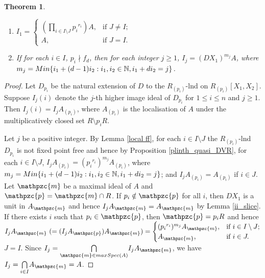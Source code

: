 \documentclass[a4paper,12pt]{article}
\newtheorem{thm}{Theorem}[section]
\newcommand{\p}{\mathpzc{p}}
\newcommand{\m}{\mathpzc{m}}
\newcommand{\bN}{\mathbb N}
\begin{document}
{\begin{thm}
\begin{enumerate}
	\item[\rm(I)] $I_1=
	\begin{cases}
		({\underset{i\in I\setminus J}\prod}{p_i}^{r_i})A, & \text{if } J\neq I;\\
		A, & \text{if } J=I.
	\end{cases}
	$
	\item[\rm(II)]  If for each $i\in I$, $p_i\nmid f_d$, then for each integer $j\geqslant 1$, $I_j=(DX_1)^{m_j}A$, where $m_j={\rm Min}\{i_1+(d-1)i_2:i_1,i_2\in\bN,i_1+di_2=j\}$.
	
	
\end{enumerate}
\end{thm}

\begin{proof} 
Let $D_{p_i}$ be the natural extension of $D$ to the $R_{(p_i)}$-lnd on $R_{(p_i)}[X_1,X_2]$. Suppose ${I_j}({i})$ denote the $j$-th higher image ideal of $D_{p_i}$ for $1\leqslant i\leqslant n$ and $j\geqslant 1$. Then $I_j(i)=I_jA_{(p_i)}$, where $A_{(p_i)}$ is the localisation of $A$ under the multiplicatively closed set $R\setminus p_iR$.

\medskip\noindent
Let $j$ be a positive integer. By Lemma \ref{local ff}, for each $i\in I\setminus J$ the $R_{(p_i)}$-lnd $D_{p_i}$ is not fixed point free and hence by Proposition \ref{plinth_quasi_DVR}, for each $i\in I\setminus J$, $I_jA_{(p_i)}=({p_i}^{r_i})^{m_j}A_{(p_i)}$, where $m_j={\rm Min}\{i_1+(d-1)i_2:i_1,i_2\in\bN,i_1+di_2=j\}$; and $I_jA_{(p_i)}=A_{(p_i)}$ if $i\in J$. Let $\m$ be a maximal ideal of $A$ and $\p=\m\cap R$. 
If $p_i\notin\p$ for all $i$, then $DX_1$ is a unit in $A_{\m}$ and hence $I_jA_\m=A_\m$ by Lemma \ref{ii_slice}. 
If there exists $i$ such that $p_i\in \p$, then $\p=p_iR$ and hence $I_jA_\m~(=(I_jA_\p)A_\m)=
\begin{cases}  
	({p_i}^{r_i})^{m_j}A_\m, & \text{if } i\in I\setminus J;\\
	A_\m, & \text{if } i\in J. 
\end{cases}
$\\
 $J=I$.
Since $I_j={\underset{\m\in {\rm maxSpec}(A)}\bigcap} I_jA_\m$, we have $I_j=\underset{i\in I}\bigcap A_\m=A$. 


\end{proof}}
\end{document}
